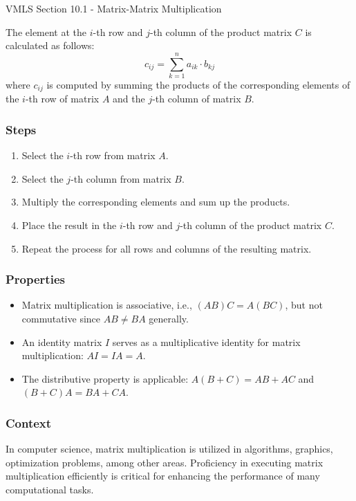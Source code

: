 \begin{notes}{VMLS Section 10.1 - Matrix-Matrix Multiplication}
    \begin{highlight}
        The element at the $i$-th row and $j$-th column of the product matrix $C$ is calculated as follows:
        \begin{equation*}
            c_{ij} = \sum_{k=1}^{n} a_{ik} \cdot b_{kj}
        \end{equation*}
        where $c_{ij}$ is computed by summing the products of the corresponding elements of the $i$-th row of matrix $A$ and the $j$-th column of matrix $B$.
        \subsubsection*{Steps}
        \begin{enumerate}
            \item Select the $i$-th row from matrix $A$.
            \item Select the $j$-th column from matrix $B$.
            \item Multiply the corresponding elements and sum up the products.
            \item Place the result in the $i$-th row and $j$-th column of the product matrix $C$.
            \item Repeat the process for all rows and columns of the resulting matrix.
        \end{enumerate}
    \end{highlight}
    
    \subsubsection*{Properties}
    \begin{itemize}
        \item Matrix multiplication is associative, i.e., $(AB)C = A(BC)$, but not commutative since $AB \neq BA$ generally.
        \item An identity matrix $I$ serves as a multiplicative identity for matrix multiplication: $AI = IA = A$.
        \item The distributive property is applicable: $A(B + C) = AB + AC$ and $(B + C)A = BA + CA$.
    \end{itemize}
    
    \subsubsection*{Context}
    In computer science, matrix multiplication is utilized in algorithms, graphics, optimization problems, among other areas. Proficiency in executing matrix multiplication efficiently is critical for 
    enhancing the performance of many computational tasks.
\end{notes}

